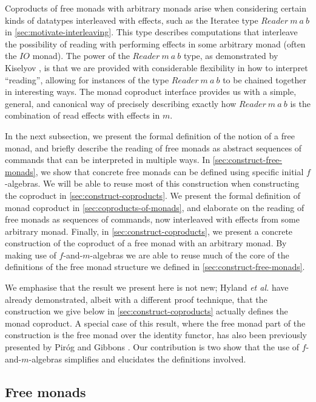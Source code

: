 \documentclass{jfp1}
\begin{document}
Coproducts of free monads with arbitrary monads arise when considering
certain kinds of datatypes interleaved with effects, such as the
Iteratee type $\mathit{Reader}~m~a~b$ in
\autoref{sec:motivate-interleaving}. This type describes computations
that interleave the possibility of reading with performing effects in
some arbitrary monad (often the $\mathit{IO}$ monad). The power of the
$\mathit{Reader}~m~a~b$ type, as demonstrated by Kiselyov
\cite{kiselyov12iteratees}, is that we are provided with considerable
flexibility in how to interpret ``reading'', allowing for instances of
the type $\mathit{Reader}~m~a~b$ to be chained together in interesting
ways. The monad coproduct interface provides us with a simple,
general, and canonical way of precisely describing exactly how
$\mathit{Reader}~m~a~b$ is the combination of read effects with
effects in $m$.

In the next subsection, we present the formal definition of the notion of a free
monad, and briefly describe the reading of free monads as abstract
sequences of commands that can be interpreted in multiple ways. In
\autoref{sec:construct-free-monads}, we show that concrete free monads
can be defined using specific initial $f$-algebras. We will be able to reuse
most of this construction when constructing the coproduct in
\autoref{sec:construct-coproducts}. We present the formal definition of
monad coproduct in \autoref{sec:coproducts-of-monads}, and elaborate
on the reading of free monads as sequences of commands, now
interleaved with effects from some arbitrary monad. Finally, in
\autoref{sec:construct-coproducts}, we present a concrete construction
of the coproduct of a free monad with an arbitrary monad. By making
use of $f$-and-$m$-algebras we are able to reuse much of the core of
the definitions of the free monad structure we defined in
\autoref{sec:construct-free-monads}.

We emphasise that the result we present here is not new; Hyland
\emph{et al.} have already demonstrated, albeit with a different proof
technique, that the construction we give below in
\autoref{sec:construct-coproducts} actually defines the monad
coproduct. A special case of this result, where the free monad part of
the construction is the free monad over the identity functor, has also
been previously presented by Pir{\'o}g and Gibbons
\cite{pirog12tracing}. Our contribution is two show that the use of
$f$-and-$m$-algebras simplifies and elucidates the definitions
involved.

\subsection{Free monads}
\label{sec:free-monads}
\end{document}
